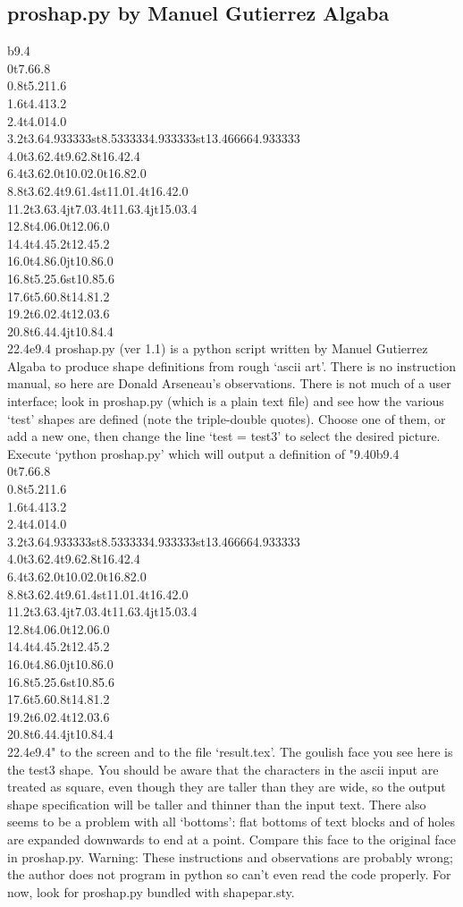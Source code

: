 \documentclass[draft]{article}
\makeatletter
\DeclareRobustCommand{\_}{%
  \ifmmode \nfss@text{\textunderscore}\else \BreakableUnderscore \fi}
\makeatother
\begin{document}
\subsection{proshap.py by Man\-uel Gu\-ti\-er\-rez Al\-ga\-ba}
\gdef\bassshape{{9.4}{0}b{9.4}
\\{0}t{7.6}{6.8}
\\{0.8}t{5.2}{11.6}
\\{1.6}t{4.4}{13.2}
\\{2.4}t{4.0}{14.0}
\\{3.2}t{3.6}{4.933333}st{8.533333}{4.933333}st{13.46666}{4.933333}
\\{4.0}t{3.6}{2.4}t{9.6}{2.8}t{16.4}{2.4}
\\{6.4}t{3.6}{2.0}t{10.0}{2.0}t{16.8}{2.0}
\\{8.8}t{3.6}{2.4}t{9.6}{1.4}st{11.0}{1.4}t{16.4}{2.0}
\\{11.2}t{3.6}{3.4}jt{7.0}{3.4}t{11.6}{3.4}jt{15.0}{3.4}
\\{12.8}t{4.0}{6.0}t{12.0}{6.0}
\\{14.4}t{4.4}{5.2}t{12.4}{5.2}
\\{16.0}t{4.8}{6.0}jt{10.8}{6.0}
\\{16.8}t{5.2}{5.6}st{10.8}{5.6}
\\{17.6}t{5.6}{0.8}t{14.8}{1.2}
\\{19.2}t{6.0}{2.4}t{12.0}{3.6}
\\{20.8}t{6.4}{4.4}jt{10.8}{4.4}
\\{22.4}e{9.4}}


\shapepar\bassshape
proshap.py (ver 1.1) is a python script written by Man\-uel
Gu\-ti\-er\-rez Al\-ga\-ba to produce shape definitions from rough
`ascii art'.  There is no instruction manual, so here are Donald
Arseneau's observations. There is not much of a user interface; look
in proshap.py (which is a plain text file) and see how the various
`test' shapes are defined (note the triple-double quotes).  Choose
one of them, or add a new one, then change the line `test = test3' to select
the desired picture.  Execute `python proshap.py' which will output a
definition of "\bassshape" to the screen and to the file `result.tex'.
The goul\-ish face you see here is the test3 shape.  You should be
aware that the characters in the ascii input are treated as square,
even though they are taller than they are wide, so the output shape
specification will be taller and thinner than the input text.  There
also seems to be a problem with all `bottoms': flat bottoms of text
blocks and of holes are expanded downwards to end at a point.  Compare
this face to the original face in proshap.py.  Warning: These
instructions and observations are probably wrong; the author does not
program in python so can't even read the code properly.  For now, look
for proshap.py bundled with shapepar.sty.
\end{document}
